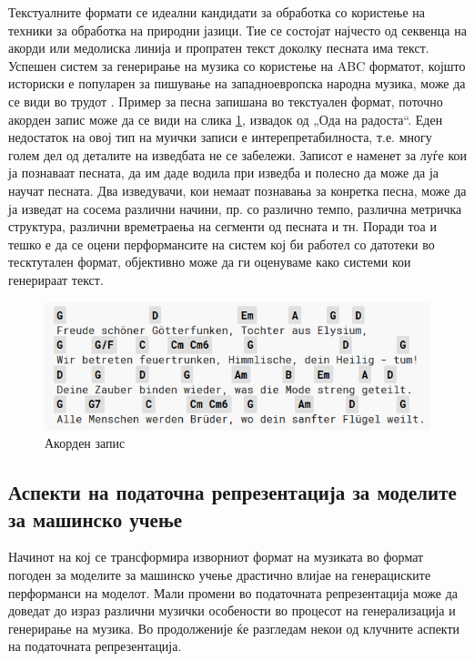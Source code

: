 Текстуалните формати се идеални кандидати за обработка со користење на техники за обработка на природни јазици. Тие се состојат најчесто од секвенца на акорди или медолиска линија и пропратен текст доколку песната има текст. Успешен систем за генерирање на музика со користење на ABC форматот, којшто историски е популарен за пишување на западноевропска народна музика, може да се види во трудот \cite{Sturm2015}. Пример за песна запишана во текстуален формат, поточно акорден запис може да се види на слика \ref{fig:akordi}, извадок од „Ода на радоста“. Еден недостаток на овој тип на муички записи е интерепретабилноста, т.е. многу голем дел од деталите на изведбата не се забележи. Записот е наменет за луѓе кои ја познаваат песната, да им даде водила при изведба и полесно да може да ја научат песната. Два изведувачи, кои немаат познавања за конретка песна, може да ја изведат на сосема различни начини, пр. со различно темпо, различна метричка структура, различни времетраења на сегменти од песната и тн. Поради тоа и тешко е да се оцени перформансите на систем кој би работел со датотеки во тесктутален формат, објективно може да ги оценуваме како системи кои генерираат текст.

\begin{figure}[H]
	\centering
\includegraphics[scale=0.9]{images/ode_to_joy.png}
	\caption{Акорден запис}
	\label{fig:akordi}
\end{figure}

\subsection{Аспекти на податочна репрезентација за моделите за машинско учење}

Начинот на кој се трансформира изворниот формат на музиката во формат погоден за моделите за машинско учење драстично влијае на генерациските перформанси на моделот. Мали промени во податочната репрезентација може да доведат до израз различни музички особености во процесот на генерализација и генерирање на музика. Во продолженије ќе разгледам некои од клучните аспекти на податочната репрезентација.

